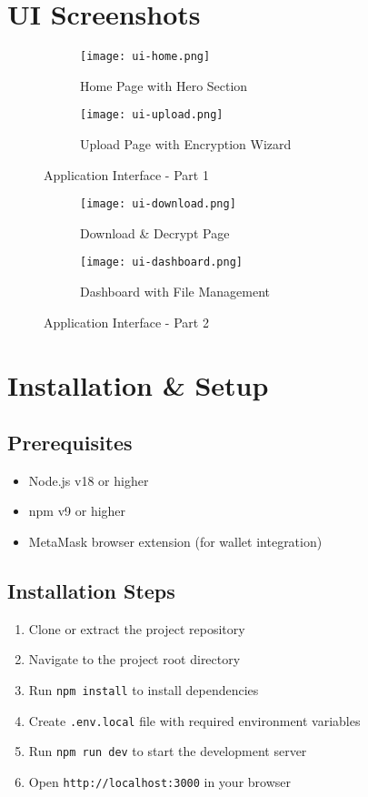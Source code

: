 \section{UI Screenshots}
\begin{figure}[H]
  \centering
  \begin{subfigure}{0.48\textwidth}
    \centering
    \texttt{[image: ui-home.png]}
    \caption{Home Page with Hero Section}
  \end{subfigure}\hfill
  \begin{subfigure}{0.48\textwidth}
    \centering
    \texttt{[image: ui-upload.png]}
    \caption{Upload Page with Encryption Wizard}
  \end{subfigure}
  \caption{Application Interface - Part 1}
\end{figure}

\begin{figure}[H]
  \centering
  \begin{subfigure}{0.48\textwidth}
    \centering
    \texttt{[image: ui-download.png]}
    \caption{Download \& Decrypt Page}
  \end{subfigure}\hfill
  \begin{subfigure}{0.48\textwidth}
    \centering
    \texttt{[image: ui-dashboard.png]}
    \caption{Dashboard with File Management}
  \end{subfigure}
  \caption{Application Interface - Part 2}
\end{figure}

\section{Installation \& Setup}
\subsection*{Prerequisites}
\begin{itemize}
  \item Node.js v18 or higher
  \item npm v9 or higher
  \item MetaMask browser extension (for wallet integration)
\end{itemize}

\subsection*{Installation Steps}
\begin{enumerate}
  \item Clone or extract the project repository
  \item Navigate to the project root directory
  \item Run \texttt{npm install} to install dependencies
  \item Create \texttt{.env.local} file with required environment variables
  \item Run \texttt{npm run dev} to start the development server
  \item Open \texttt{http://localhost:3000} in your browser
\end{enumerate}

